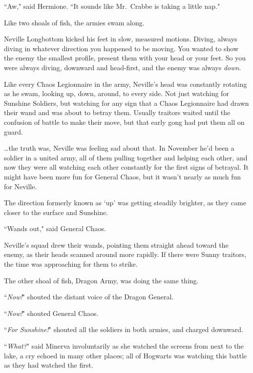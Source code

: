 ``Aw," said Hermione. ``It sounds like Mr.~Crabbe is taking a little nap."

\later

Like two shoals of fish, the armies swam along.

Neville Longbottom kicked his feet in slow, measured motions. Diving, always diving in whatever direction you happened to be moving. You wanted to show the enemy the smallest profile, present them with your head or your feet. So you were always diving, downward and head-first, and the enemy was always \emph{down}.

Like every Chaos Legionnaire in the army, Neville's head was constantly rotating as he swam, looking up, down, around, to every side. Not just watching for Sunshine Soldiers, but watching for any sign that a Chaos Legionnaire had drawn their wand and was about to betray them. Usually traitors waited until the confusion of battle to make their move, but that early gong had put them all on guard.

{\ldots}the truth was, Neville was feeling sad about that. In November he'd been a soldier in a united army, all of them pulling together and helping each other, and now they were all watching each other constantly for the first signs of betrayal. It might have been more fun for General Chaos, but it wasn't nearly as much fun for Neville.

The direction formerly known as `up' was getting steadily brighter, as they came closer to the surface and Sunshine.

``Wands out," said General Chaos.

Neville's squad drew their wands, pointing them straight ahead toward the enemy, as their heads scanned around more rapidly. If there were Sunny traitors, the time was approaching for them to strike.

The other shoal of fish, Dragon Army, was doing the same thing.

``\emph{Now!}" shouted the distant voice of the Dragon General.

``\emph{Now!}" shouted General Chaos.

``\emph{For Sunshine!}" shouted all the soldiers in both armies, and charged downward.

\later

``\emph{What?}" said Minerva involuntarily as she watched the screens from next to the lake, a cry echoed in many other places; all of Hogwarts was watching this battle as they had watched the first.

